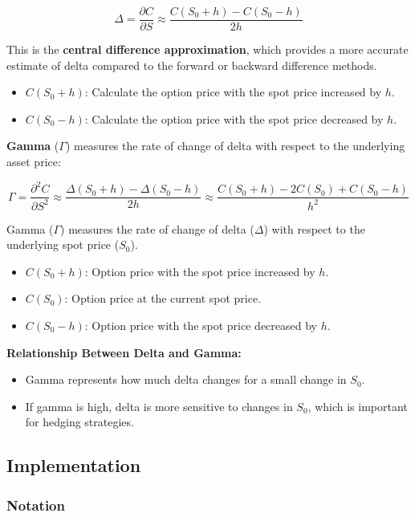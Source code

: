 \documentclass[
  letterpaper,
  DIV=11,
  numbers=noendperiod]{scrartcl}
\providecommand{\tightlist}{%
  \setlength{\itemsep}{0pt}\setlength{\parskip}{0pt}}
\begin{document}
\[
\Delta = \frac{\partial C}{\partial S}\approx \frac{C(S_0 + h) - C(S_0 - h)}{2h}
\]

This is the \textbf{central difference approximation}, which provides a
more accurate estimate of delta compared to the forward or backward
difference methods.

\begin{itemize}
\tightlist
\item
  \(C(S_0 + h)\): Calculate the option price with the spot price
  increased by \(h\).
\item
  \(C(S_0 - h)\): Calculate the option price with the spot price
  decreased by \(h\).
\end{itemize}

\textbf{Gamma} (\(\Gamma\)) measures the rate of change of delta with
respect to the underlying asset price:

\[
\Gamma = \frac{\partial^2 C}{\partial S^2}\approx \frac{\Delta(S_0 + h) - \Delta(S_0 - h)}{2h}\approx \frac{C(S_0 + h) - 2C(S_0) + C(S_0 - h)}{h^2}
\]

Gamma (\(\Gamma\)) measures the rate of change of delta (\(\Delta\))
with respect to the underlying spot price (\(S_0\)).

\begin{itemize}
\tightlist
\item
  \(C(S_0 + h)\): Option price with the spot price increased by \(h\).
\item
  \(C(S_0)\): Option price at the current spot price.
\item
  \(C(S_0 - h)\): Option price with the spot price decreased by \(h\).
\end{itemize}

\textbf{Relationship Between Delta and Gamma:}

\begin{itemize}
\tightlist
\item
  Gamma represents how much delta changes for a small change in \(S_0\).
\item
  If gamma is high, delta is more sensitive to changes in \(S_0\), which
  is important for hedging strategies.
\end{itemize}

\subsection{Implementation}\label{implementation}

\subsubsection{Notation}\label{notation}
\end{document}

